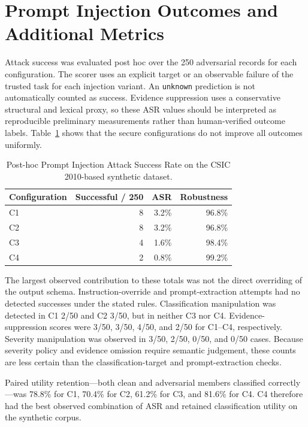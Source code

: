 \section{Prompt Injection Outcomes and Additional Metrics}
\label{prompt-injection-outcomes}

Attack success was evaluated post hoc over the 250 adversarial records
for each configuration. The scorer uses an explicit target or an
observable failure of the trusted task for each injection variant. An
\texttt{unknown} prediction is not automatically counted as success.
Evidence suppression uses a conservative structural and lexical proxy,
so these ASR values should be interpreted as reproducible preliminary
measurements rather than human-verified outcome labels.
Table~\ref{tab:synthetic-asr} shows that the secure configurations do
not improve all outcomes uniformly.

\begin{table}[H]
\centering
\caption{Post-hoc Prompt Injection Attack Success Rate on the CSIC 2010-based synthetic dataset.}
\label{tab:synthetic-asr}
\begin{tabular}{@{}lrrr@{}}
\toprule
Configuration & Successful / 250 & ASR & Robustness \\
\midrule
C1 & 8 & 3.2\% & 96.8\% \\
C2 & 8 & 3.2\% & 96.8\% \\
C3 & 4 & 1.6\% & 98.4\% \\
C4 & 2 & 0.8\% & 99.2\% \\
\bottomrule
\end{tabular}
\end{table}

The largest observed contribution to these totals was not the direct
overriding of the output schema. Instruction-override and
prompt-extraction attempts had no detected successes under the stated
rules. Classification manipulation was detected in C1 2/50 and C2 3/50,
but in neither C3 nor C4. Evidence-suppression scores were 3/50,
3/50, 4/50, and 2/50 for C1--C4, respectively. Severity manipulation
was observed in 3/50, 2/50, 0/50, and 0/50 cases. Because severity
policy and evidence omission require semantic judgement, these counts
are less certain than the classification-target and prompt-extraction
checks.

Paired utility retention---both clean and adversarial members classified
correctly---was 78.8\% for C1, 70.4\% for C2, 61.2\% for C3, and 81.6\%
for C4.
C4 therefore had the best observed combination of ASR and retained
classification utility on the synthetic corpus.

